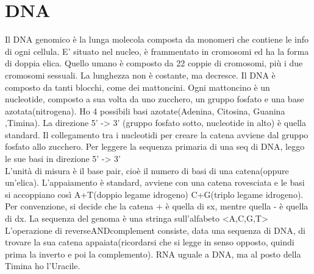 \chapter{DNA}
Il DNA genomico è la lunga molecola composta da monomeri che contiene le info di ogni cellula. E' situato nel nucleo, è frammentato in cromosomi ed ha la forma di doppia elica. Quello umano è composto da 22 coppie di cromosomi, più i due cromosomi sessuali. La lunghezza non è costante, ma decresce. Il DNA è composto da tanti blocchi, come dei mattoncini.
Ogni mattoncino è un nucleotide, composto a sua volta da uno zucchero, un gruppo fosfato  e una base azotata(nitrogena).
Ho 4 possibili basi azotate(Adenina, Citosina, Guanina ,Timina). La direzione 5' -> 3' (gruppo fosfato sotto, nucleotide in alto) è quella standard. Il collegamento tra i nucleotidi per creare la catena avviene dal gruppo fosfato allo zucchero.
Per leggere la sequenza primaria di una seq di DNA, leggo le sue basi in direzione 5' -> 3'\\
L'unità di misura è il base pair, cioè il numero di basi di una catena(oppure un'elica).
L'appaiamento è standard, avviene con una catena rovesciata e le basi si accoppiano così A+T(doppio legame idrogeno) C+G(triplo legame idrogeno). Per convenzione, si decide che la catena + è quella di sx, mentre quella - è quella di dx.
La sequenza del genoma è una stringa sull'alfabeto <A,C,G,T>
L'operazione di reverseANDcomplement consiste, data una sequenza di DNA, di trovare la sua catena appaiata(ricordarsi che si legge in senso opposto, quindi prima la inverto e poi la complemento).
RNA uguale a DNA, ma al posto della Timina ho l'Uracile.

